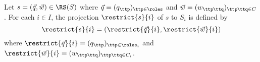 





 
\begin{definition}\label{def:projectedconf}
Let $s= (\vec{q},\vec{w})\in \RS(S)$ where $\vec{q}=(q_\ttp)_{\ttp\in\roles}$
and $\vec{w} = (w_{\ttp\ttq})_{\ttp\ttq\in C}$.
For each $i\in I$, the projection $\restrict{s}{i}$ of $s$
to $S_i$ is defined by
$$\restrict{s}{i}=(\restrict{\vec{q}}{i},\restrict{\vec{w}}{i})$$
where $\restrict{\vec{q}}{i} = (q_\ttp)_{\ttp\in\roles_i}$ and 
$\restrict{\vec{w}}{i} =  (w_{\ttp\ttq})_{\ttp\ttq\in C_{i}}$.

%                                                      
%


\end{definition}
